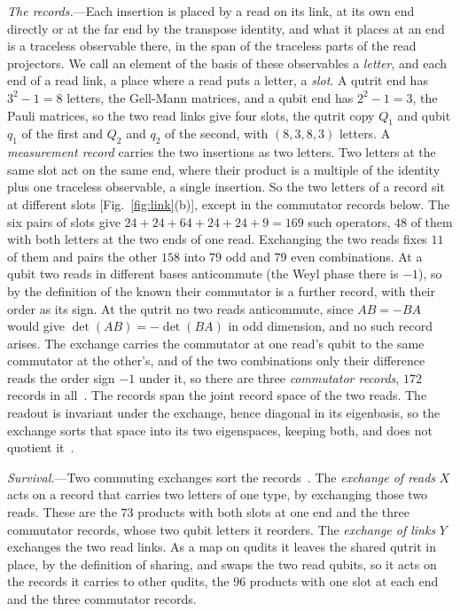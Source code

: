 \documentclass[aps,prl,reprint,superscriptaddress,longbibliography,nofootinbib,floatfix]{revtex4-2}
\theoremstyle{definition}
\begin{document}


\emph{The records.}---Each insertion is placed by a read on its link, at its own end directly or at the far end by the transpose identity, and what it places at an end is a traceless observable there, in the span of the traceless parts of the read projectors. We call an element of the basis of these observables a \emph{letter}, and each end of a read link, a place where a read puts a letter, a \emph{slot}. A qutrit end has $3^{2}-1=8$ letters, the Gell-Mann matrices, and a qubit end has $2^{2}-1=3$, the Pauli matrices, so the two read links give four slots, the qutrit copy $Q_{1}$ and qubit $q_{1}$ of the first and $Q_{2}$ and $q_{2}$ of the second, with $(8,3,8,3)$ letters. A \emph{measurement record} carries the two insertions as two letters. Two letters at the same slot act on the same end, where their product is a multiple of the identity plus one traceless observable, a single insertion. So the two letters of a record sit at different slots [Fig.~\ref{fig:link}(b)], except in the commutator records below. The six pairs of slots give $24+24+64+24+24+9=169$ such operators, $48$ of them with both letters at the two ends of one read. Exchanging the two reads fixes $11$ of them and pairs the other $158$ into $79$ odd and $79$ even combinations. At a qubit two reads in different bases anticommute (the Weyl phase there is $-1$), so by the definition of the known their commutator is a further record, with their order as its sign. At the qutrit no two reads anticommute, since $AB=-BA$ would give $\det(AB)=-\det(BA)$ in odd dimension, and no such record arises. The exchange carries the commutator at one read's qubit to the same commutator at the other's, and of the two combinations only their difference reads the order sign $-1$ under it, so there are three \emph{commutator records}, $172$ records in all~\cite{SM}. The records span the joint record space of the two reads. The readout is invariant under the exchange, hence diagonal in its eigenbasis, so the exchange sorts that space into its two eigenspaces, keeping both, and does not quotient it~\cite{SM}.

\emph{Survival.}---Two commuting exchanges sort the records~\cite{SM}. The \emph{exchange of reads} $X$ acts on a record that carries two letters of one type, by exchanging those two reads. These are the $73$ products with both slots at one end and the three commutator records, whose two qubit letters it reorders. The \emph{exchange of links} $Y$ exchanges the two read links. As a map on qudits it leaves the shared qutrit in place, by the definition of sharing, and swaps the two read qubits, so it acts on the records it carries to other qudits, the $96$ products with one slot at each end and the three commutator records.
\end{document}

